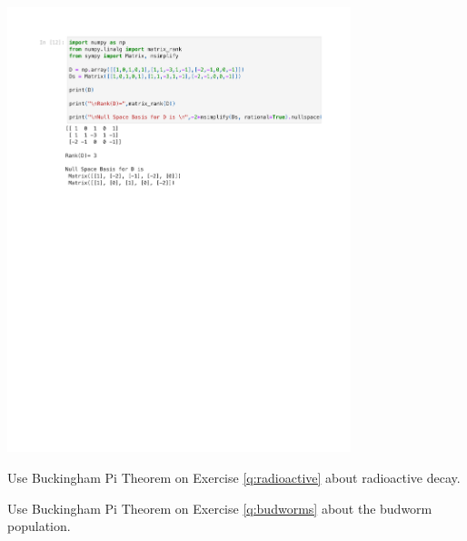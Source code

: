 \documentclass{workbook}
\begin{document}
\begin{solution}
\begin{slide}
\includegraphics[width=0.75\textwidth]{python/sphere-dimensionanalysis.pdf}

	
\end{slide}
\end{solution}


\begin{slide}

\question

\begin{parts}
	\item Use Buckingham Pi Theorem on Exercise \ref{q:radioactive} about radioactive decay.
	\item Use Buckingham Pi Theorem on Exercise \ref{q:budworms} about the budworm population.
\end{parts}
	
\end{slide}
\end{document}
